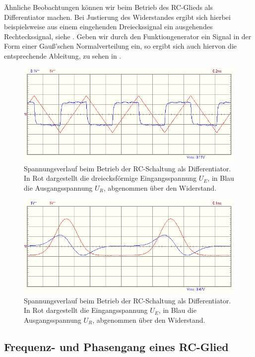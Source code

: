 Ähnliche Beobachtungen können wir beim Betrieb des RC-Glieds als Differentiator machen. Bei Justierung des Widerstandes ergibt sich hierbei beispielsweise aus einem eingehenden Dreieckssignal ein ausgehendes Rechteckssignal, siehe . Geben wir durch den Funktiongenerator ein Signal in der Form einer Gauß'schen Normalverteilung ein, so ergibt sich auch hiervon die entsprechende Ableitung, zu sehen in .


\begin{figure}[H]
  \centering
  \includegraphics[width=.8\textwidth]{files/aufgabe2_differentiator_dreieck.png}
  \caption{Spannungsverlauf beim Betrieb der RC-Schaltung als Differentiator. In Rot dargestellt die dreiecksförmige Eingangsspannung $U_E$, in Blau die Ausgangsspannung $U_R$, abgenommen über den Widerstand.}
  \label{fig:aufgabe2_differentiator_dreieck}
\end{figure}

\begin{figure}[H]
  \centering
  \includegraphics[width=.8\textwidth]{files/aufgabe2_differentiator_gauss.png}
  \caption{Spannungsverlauf beim Betrieb der RC-Schaltung als Differentiator. In Rot dargestellt die Eingangsspannung $U_E$, in Blau die Ausgangsspannung $U_R$, abgenommen über den Widerstand.}
  \label{fig:aufgabe2_differentiator_gauss}
\end{figure}


\subsection{Frequenz- und Phasengang eines RC-Glied}

